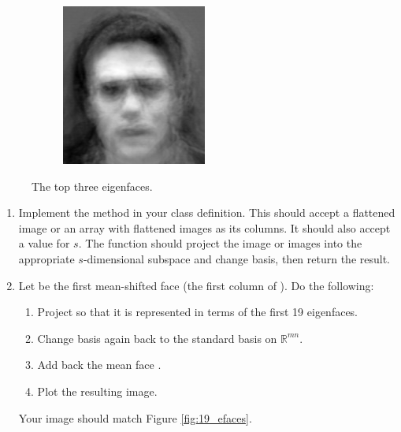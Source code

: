 \begin{figure}
\begin{subfigure}[b]{0.3\textwidth}
\end{subfigure}
\begin{subfigure}[b]{0.3\textwidth}
\includegraphics[width=\textwidth]{figures/eigenface2.png}
\end{subfigure}
\caption{The top three eigenfaces.}
\label{facialRecognition:eigenfaces}
\end{figure}

\begin{problem}
\label{prob:top_n}
\leavevmode
\begin{enumerate}
\item Implement the method   in your class definition.
This should accept a flattened image or an array with flattened images as its columns.
It should also accept a value for $s$.
The function should project the image or images into the appropriate $s$-dimensional subspace and change basis, then return the result.
\item Let  be the first mean-shifted face (the first column of ). Do the following:
\begin{enumerate}
\item Project  so that it is represented in terms of the first 19 eigenfaces.
\item Change basis again back to the standard basis on $\mathbb{R}^{mn}$.
\item Add back the mean face .
\item Plot the resulting image.
\end{enumerate}
Your image should match Figure \ref{fig:19_efaces}.
\end{enumerate}
\end{problem}


